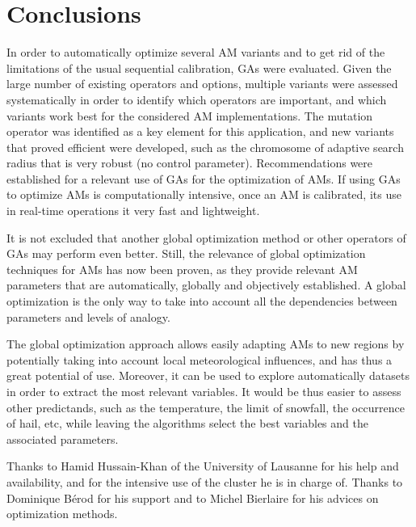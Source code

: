 \documentclass{ametsoc}
\begin{document}
\section{Conclusions}
\label{sec:conclusions}

In order to automatically optimize several AM variants and to get rid of the limitations of the usual sequential calibration, GAs were evaluated. Given the large number of existing operators and options, multiple variants were assessed systematically in order to identify which operators are important, and which variants work best for the considered AM implementations. The mutation operator was identified as a key element for this application, and new variants that proved efficient were developed, such as the chromosome of adaptive search radius that is very robust (no control parameter). Recommendations were established for a relevant use of GAs for the optimization of AMs. If using GAs to optimize AMs is computationally intensive, once an AM is calibrated, its use in real-time operations it very fast and lightweight.

It is not excluded that another global optimization method or other operators of GAs may perform even better. Still, the relevance of global optimization techniques for AMs has now been proven, as they provide relevant AM parameters that are automatically, globally and objectively established. A global optimization is the only way to take into account all the dependencies between parameters and levels of analogy.

The global optimization approach allows easily adapting AMs to new regions by potentially taking into account local meteorological influences, and has thus a great potential of use. Moreover, it can be used to explore automatically datasets in order to extract the most relevant variables. It would be thus easier to assess other predictands, such as the temperature, the limit of snowfall, the occurrence of hail, etc, while leaving the algorithms select the best variables and the associated parameters.


%
\acknowledgments
Thanks to Hamid Hussain-Khan of the University of Lausanne for his help and availability, and for the intensive use of the cluster he is in charge of. Thanks to Dominique B\'{e}rod for his support and to Michel Bierlaire for his advices on optimization methods.
\end{document}
